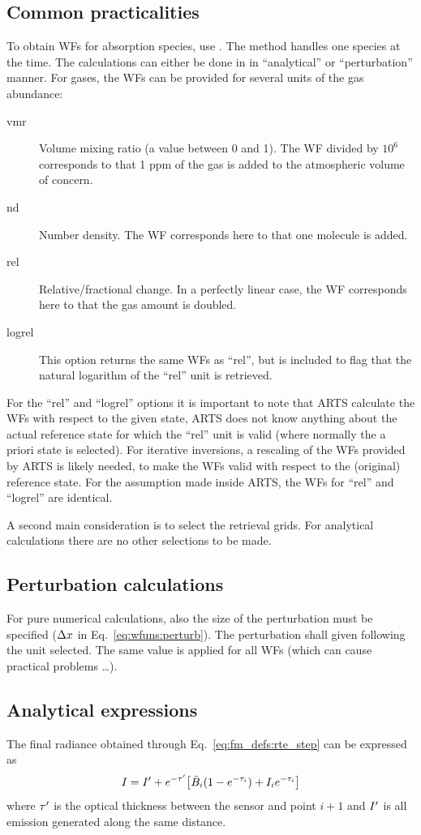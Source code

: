 \subsection{Common practicalities}
%
To obtain WFs for absorption species, use . The
method handles one species at the time. The calculations can either be done in
in ``analytical'' or ``perturbation'' manner.
For gases, the WFs can be provided for several units of the gas abundance:
\begin{description}
\item[vmr] Volume mixing ratio (a value between 0 and 1). The WF divided by
  $10^6$ corresponds to that 1 ppm of the gas is added to the atmospheric
  volume of concern.
\item[nd] Number density. The WF corresponds here to that one molecule is added.
\item[rel] Relative/fractional change. In a perfectly linear case, the WF
  corresponds here to that the gas amount is doubled.
\item[logrel] This option returns the same WFs as ``rel'', but is included to
  flag that the natural logarithm of the ``rel'' unit is retrieved.
\end{description}
For the ``rel'' and ``logrel'' options it is important to note that ARTS
calculate the WFs with respect to the given state, ARTS does not know anything
about the actual reference state for which the ``rel'' unit is valid (where
normally the a priori state is selected). For iterative inversions, a rescaling
of the WFs provided by ARTS is likely needed, to make the WFs valid with
respect to the (original) reference state. For the assumption made inside ARTS,
the WFs for ``rel'' and ``logrel'' are identical.

A second main consideration is to select the retrieval grids. For analytical
calculations there are no other selections to be made. 


\subsection{Perturbation calculations}
%
For pure numerical calculations, also the size of the perturbation must be
specified ($\Delta x$ in Eq.~\ref{eq:wfuns:perturb}). The perturbation
shall given following the unit selected. The same value is applied for all WFs
(which can cause practical problems \dots).


\subsection{Analytical expressions}
%
The final radiance obtained through Eq.~\ref{eq:fm_defs:rte_step} can be
expressed as
\begin{equation}
  \label{eq:I4J}
  I = I'+ e^{-\tau'}\!\left[ \bar{B}_i(1-e^{-\tau_{i}}) + 
                                         I_{i}e^{-\tau_{i}} \right]
\end{equation}
where $\tau'$ is the optical thickness between the sensor and point $i+1$
and $I'$ is all emission generated along the same distance.

